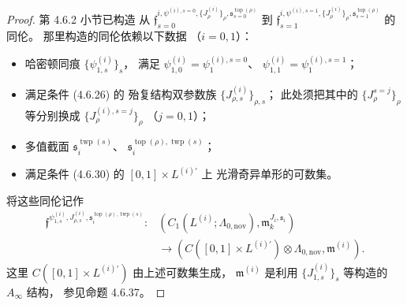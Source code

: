 \begin{proof}
第 4.6.2 小节已构造
从
$\mathfrak f_{s=0}^{i,\psi^{(i),s=0},
\{J^{(i)}_\rho\}_\rho,
\mathfrak s_{s=0}^{\operatorname{top}(\rho)}}$
到
$\mathfrak f_{s=1}^{i,\psi^{(i),s=1},
\{J^{(i)}_\rho\}_\rho,
\mathfrak s_{s=1}^{\operatorname{top}(\rho)}}$
的同伦。
那里构造的同伦依赖以下数据
（$i=0,1$）：
\begin{itemize}
\item 哈密顿同痕
$\{\psi^{(i)}_{1,s}\}_s$，
满足
$\psi^{(i)}_{1,0}
=\psi^{(i),s=0}_1$、
$\psi^{(i)}_{1,1}
=\psi^{(i),s=1}_1$；
\item 满足条件 (4.6.26) 的
殆复结构双参数族
$\{J^{(i)}_{\rho,s}\}_{\rho,s}$；
此处须把其中的
$\{J^{s=j}_\rho\}_\rho$
等分别换成
$\{J^{(i),s=j}_\rho\}_\rho$
（$j=0,1$）；
\item 多值截面
$\mathfrak s_i^{\operatorname{twp}(s)}$、
$\mathfrak s_i^{
\operatorname{top}(\rho),\operatorname{twp}(s)}$；
\item 满足条件 (4.6.30) 的
$[0,1]\times L^{(i)\prime}$ 上
光滑奇异单形的可数集。
\end{itemize}
将这些同伦记作
\begin{equation}
\begin{aligned}
\mathfrak f^{
\psi^{(i)}_{1,s},J^{(i)}_{\rho,s},
\mathfrak s_i^{
\operatorname{top}(\rho),\operatorname{twp}(s)}}
\colon&
(C_1(L^{(i)};\Lambda_{0,\mathrm{nov}}),
\mathfrak m_k^{J_i,\mathfrak s_i})
\\
&\longrightarrow
(C([0,1]\times L^{(i)\prime})
\otimes\Lambda_{0,\mathrm{nov}},
\mathfrak m^{(i)}).
\end{aligned}
\tag{5.3.28}\label{eq:5-3-28}
\end{equation}
这里
$C([0,1]\times L^{(i)\prime})$
由上述可数集生成，
$\mathfrak m^{(i)}$
是利用 $\{J^{(i)}_{1,s}\}_s$
等构造的 $A_\infty$ 结构，
参见命题 4.6.37。


\end{proof}
